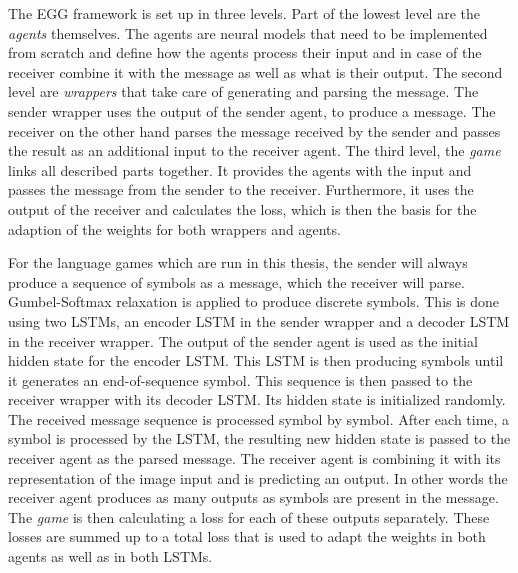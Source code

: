 The EGG framework is set up in three levels.
Part of the lowest level are the \emph{agents} themselves.
The agents are neural models that need to be implemented from scratch and define how the agents process their input and in case of the receiver combine it with the message as well as what is their output.
The second level are \emph{wrappers} that take care of generating and parsing the message.
The sender wrapper uses the output of the sender agent, to produce a message.
The receiver on the other hand parses the message received by the sender and passes the result as an additional input to the receiver agent.
The third level, the \emph{game} links all described parts together.
It provides the agents with the input and passes the message from the sender to the receiver.
Furthermore, it uses the output of the receiver and calculates the loss, which is then the basis for the adaption of the weights for both wrappers and agents.

For the language games which are run in this thesis, the sender will always produce a sequence of symbols as a message, which the receiver will parse.
Gumbel-Softmax relaxation is applied to produce discrete symbols.
This is done using two LSTMs, an encoder LSTM in the sender wrapper and a decoder LSTM in the receiver wrapper.
The output of the sender agent is used as the initial hidden state for the encoder LSTM.
This LSTM is then producing symbols until it generates an end-of-sequence symbol.
This sequence is then passed to the receiver wrapper with its decoder LSTM.
Its hidden state is initialized randomly.
The received message sequence is processed symbol by symbol.
After each time, a symbol is processed by the LSTM, the resulting new hidden state is passed to the receiver agent as the parsed message.
The receiver agent is combining it with its representation of the image input and is predicting an output.
In other words the receiver agent produces as many outputs as symbols are present in the message.
The \emph{game} is then calculating a loss for each of these outputs separately.
These losses are summed up to a total loss that is used to adapt the weights in both agents as well as in both LSTMs.



